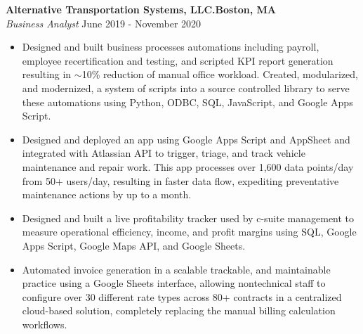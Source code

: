 \documentclass[a4paper]{article}
\begin{document}
\textbf{Alternative Transportation Systems, LLC.\hfill Boston, MA}\\
\textit{Business Analyst} \hfill June 2019 - November 2020\\
\vspace{-1mm}
\begin{itemize} \itemsep 1pt
	\item Designed and built business processes automations including payroll, employee recertification and testing, and scripted KPI report generation resulting in $\sim$10\% reduction of manual office workload. 
    Created, modularized, and modernized, a system of scripts into a source controlled library to serve these automations using Python, ODBC, SQL, JavaScript, and Google Apps Script.
	\item Designed and deployed an app using Google Apps Script and AppSheet and integrated with Atlassian API to trigger, triage, and track vehicle maintenance and repair work. This app processes over 1,600 data points/day from 50+ users/day, resulting in faster data flow, expediting preventative maintenance actions by up to a month.
	\item Designed and built a live profitability tracker used by c-suite management to measure operational efficiency, income, and profit margins using SQL, Google Apps Script, Google Maps API, and Google Sheets.
	\item Automated invoice generation in a scalable trackable, and maintainable practice using a Google Sheets interface, allowing nontechnical staff to configure over 30 different rate types across 80+ contracts in a centralized cloud-based solution, completely replacing the manual billing calculation workflows.
\end{itemize}
\end{document}
